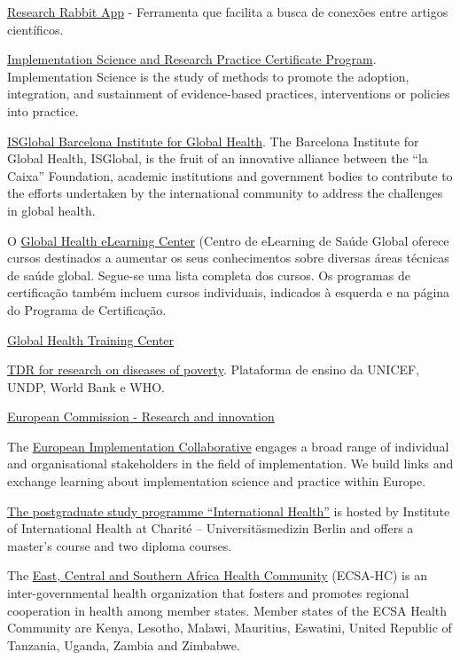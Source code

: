 \documentclass[
  letterpaper,
  DIV=11,
  numbers=noendperiod]{scrreprt}
\begin{document}
\href{https://researchrabbitapp.com/}{Research Rabbit App} - Ferramenta
que facilita a busca de conexões entre artigos científicos.

\href{https://publichealth.jhu.edu/academics/implementation-science-and-research-practice-certificate-program}{Implementation
Science and Research Practice Certificate Program}. Implementation
Science is the study of methods to promote the adoption, integration,
and sustainment of evidence-based practices, interventions or policies
into practice.

\href{https://www.isglobal.org/en/about-us}{ISGlobal Barcelona Institute
for Global Health}. The Barcelona Institute for Global Health, ISGlobal,
is the fruit of an innovative alliance between the ``la Caixa''
Foundation, academic institutions and government bodies to contribute to
the efforts undertaken by the international community to address the
challenges in global health.

O \href{https://www.globalhealthlearning.org/pt/courses}{Global Health
eLearning Center} (Centro de eLearning de Saúde Global oferece cursos
destinados a aumentar os seus conhecimentos sobre diversas áreas
técnicas de saúde global. Segue-se uma lista completa dos cursos. Os
programas de certificação também incluem cursos individuais, indicados à
esquerda e na página do Programa de Certificação.

\href{https://globalhealthtrainingcentre.tghn.org/elearning/}{Global
Health Training Center}

\href{https://tdrmooc.org/login?next=/dashboard}{TDR for research on
diseases of poverty}. Plataforma de ensino da UNICEF, UNDP, World Bank e
WHO.

\href{https://research-and-innovation.ec.europa.eu/funding/funding-opportunities/funding-programmes-and-open-calls/horizon-europe/cluster-1-health_en}{European
Commission - Research and innovation}

The \href{https://implementation.eu/}{European Implementation
Collaborative} engages a broad range of individual and organisational
stakeholders in the field of implementation. We build links and exchange
learning about implementation science and practice within Europe.

\href{https://internationalhealth.charite.de/en/}{The postgraduate study
programme ``International Health''} is hosted by Institute of
International Health at Charité -- Universitäsmedizin Berlin and offers
a master's course and two diploma courses.

The \href{https://ecsahc.org/ecsa-hc-at-a-glance/}{East, Central and
Southern Africa Health Community} (ECSA-HC) is an inter-governmental
health organization that fosters and promotes regional cooperation in
health among member states. Member states of the ECSA Health Community
are Kenya, Lesotho, Malawi, Mauritius, Eswatini, United Republic of
Tanzania, Uganda, Zambia and Zimbabwe.
\end{document}
